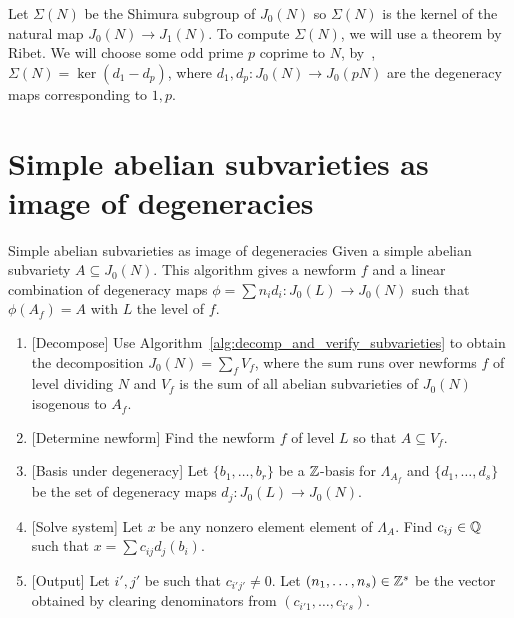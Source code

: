 Let $\Sigma(N)$ be the Shimura subgroup of $J_0(N)$ so $\Sigma(N)$ is the
kernel of the natural map $J_0(N)\to J_1(N)$. To compute $\Sigma(N)$, we will
use a theorem by Ribet. We will choose some odd prime $p$ coprime to $N$,
by~\cite[Prop. 1]{ribet:raising}, $\Sigma(N)=\ker(d_1-d_p)$, where
$d_1,d_p:J_0(N)\to J_0(pN)$ are the degeneracy maps corresponding to $1,p$.

\section{Simple abelian subvarieties as image of degeneracies}
\begin{algorithm}{Simple abelian subvarieties as image of degeneracies}%
    \label{alg:simple_degen}
    Given a simple abelian subvariety $A\subseteq J_0(N)$. This algorithm
    gives a newform $f$ and a linear combination of degeneracy maps
    $\phi=\sum n_i d_i:J_0(L)\to J_0(N)$ such that $\phi(A_f)=A$ with $L$ the
    level of $f$.
    \begin{enumerate}
        \item{} [Decompose]
            Use Algorithm~\ref{alg:decomp_and_verify_subvarieties} to obtain
            the decomposition $J_0(N)=\sum_f V_f$, where the sum runs over
            newforms $f$ of level dividing $N$ and $V_f$ is the sum of all
            abelian subvarieties of $J_0(N)$ isogenous to $A_f$.
        \item{} [Determine newform]
            Find the newform $f$ of level $L$ so that $A\subseteq V_f$.
        \item{} [Basis under degeneracy]
            Let $\{b_1,\ldots,b_r\}$ be a $\mathbb{Z}$-basis for $\Lambda_{A_f}$ and
            $\{d_1,\ldots,d_s\}$ be the set of degeneracy maps $d_j:J_0(L)\to
            J_0(N)$.
        \item{} [Solve system]
            Let $x$ be any nonzero element element of $\Lambda_A$. Find
            $c_{ij}\in \mathbb{Q}$ such that $x=\sum c_{ij} d_j(b_i)$.
        \item{} [Output]
            Let $i', j'$ be such that $c_{i'j'}\neq 0$. Let
            $(n_1,\ldots,n_s)\in \mathbb{Z}^s$ be the vector obtained by
            clearing denominators from $(c_{i'1},\ldots,c_{i's})$.
    \end{enumerate}
\end{algorithm}



